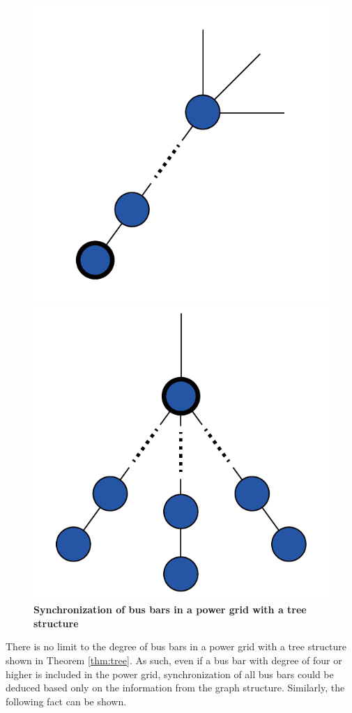 \documentclass[graybox, envcountchap]{svmult}
\begin{document}
\begin{figure}[t]
  \centering
  {
  \begin{minipage}{0.40\linewidth}
    \centering
    \includegraphics[width = .50\linewidth]{figs/treesub}
    \subcaption{ }
  \end{minipage}
  \begin{minipage}{0.40\linewidth}
    \centering
    \includegraphics[width = .50\linewidth]{figs/tree}
    \subcaption{ }
  \end{minipage}
  \medskip
  \caption{\textbf{Synchronization of bus bars in a power grid with a tree structure}}
  \label{fig:treepr}
  }
\medskip
\end{figure}
There is no limit to the degree of bus bars in a power grid with a tree structure shown in Theorem \ref{thm:tree}.
As such, even if a bus bar with degree of four or higher is included in the power grid, synchronization of all bus bars could be deduced based only on the information from the graph structure.
Similarly, the following fact can be shown.
\end{document}
